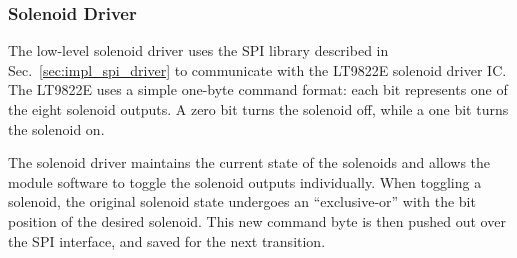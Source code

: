 

\subsubsection{Solenoid Driver}

The low-level solenoid driver uses the SPI library described in Sec.\ \ref{sec:impl_spi_driver} to communicate with the LT9822E solenoid driver IC. The LT9822E uses a simple one-byte command format: each bit represents one of the eight solenoid outputs. A zero bit turns the solenoid off, while a one bit turns the solenoid on. 

The solenoid driver maintains the current state of the solenoids and allows the module software to toggle the solenoid outputs individually. When toggling a solenoid, the original solenoid state undergoes an ``exclusive-or'' with the bit position of the desired solenoid. This new command byte is then pushed out over the SPI interface, and saved for the next transition.

